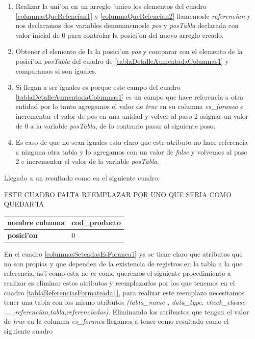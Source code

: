 \begin{enumerate}
\item Realizar la uni'on en un arreglo 'unico los elementos del cuadro \ref{columnasQueRefencian1} y \ref{columnaQueRefencian2} llamemosle \textit{referencian} y nos declaramos dos variables denominemosle \textit{pos} y \textit{posTabla} declarada con valor inicial de 0 para controlar la posici'on del nuevo arreglo creado.
\item Obtener el elemento de la la posici'on \textit{pos} y comparar con el elemento de la posici'on \textit{posTabla} del cuadro de \ref{tablaDetalleAumentadaColumnas1} y comparamos si son iguales.
\item Si llegan a ser iguales es porque este campo del cuadro \ref{tablaDetalleAumentadaColumnas1} es un campo que hace referencia a otra entidad por lo tanto agregamos el valor de \textit{true} en su columna \textit{es\_foranea} e incrementar el valor de pos en una unidad y volver al paso 2 asignar un valor de 0 a la variable \textit{posTabla}, de lo contrario pasar al siguiente paso.
\item Es caso de que no sean iguales esta claro que este atributo no hace referencia a ninguna otra tabla y lo agregamos con un valor de \textit{false} y volvemos al paso 2 e incrementar el valor de la variable \textit{posTabla}.
\end{enumerate}
Llegado a un resultado como en el siguiente cuadro:

ESTE CUADRO FALTA REEMPLAZAR POR UNO QUE SERIA COMO QUEDAR'IA
 
\begin{center}
  \label{columnasSeteadasEsForanea1} %
  \begin{tabular}{|l|l|}
  \hline 
  \textbf{nombre columna} & cod\_producto \\ \hline
  \textbf{posici'on}      & 0             \\ \hline
  \end{tabular}
\end{center}

En el cuadro \ref{columnasSeteadasEsForanea1} ya se tiene claro que atributos que no son propias y que dependen de la existencia de registros en la tabla a la que referencia, as'i como esta no es como queremos el siguiente procedimiento a realizar es eliminar estos atributos y reemplazarlos por los que tenemos en el cuadro \ref{tablaReferenciasFormateada1}, para realizar este reemplazo necesitamos tener una tabla con los mismo atributos \textit{(tabla\_name , data\_type, check\_clause ... ,referencian,tabla,referenciados)}. Eliminando los atribustos que tengan el valor de \textit{true} en la columna \textit{es\_foranea} llegamos a tener como resultado como el siguiente cuadro

